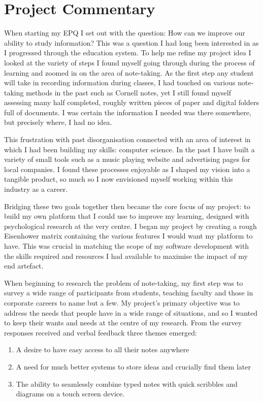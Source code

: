 \chapter{Project Commentary}
When starting my EPQ I set out with the question: How can we improve our ability to study information? This was a question I had long been interested in as I progressed through the education system. To help me refine my project idea I looked at the variety of steps I found myself going through during the process of learning and zoomed in on the area of note-taking. As the first step any student will take in recording information during classes, I had touched on various note-taking methods in the past such as Cornell notes, yet I still found myself assessing many half completed, roughly written pieces of paper and digital folders full of documents. I was certain the information I needed was there somewhere, but precisely where, I had no idea.

This frustration with past disorganisation connected with an area of interest in which I had been building my skills: computer science. In the past I have built a variety of small tools such as a music playing website and advertising pages for local companies. I found these processes enjoyable as I shaped my vision into a tangible product, so much so I now envisioned myself working within this industry as a career. 

Bridging these two goals together then became the core focus of my project: to build my own platform that I could use to improve my learning, designed with psychological research at the very centre. I began my project by creating a rough Eisenhower matrix containing the various features I would want my platform to have. This was crucial in matching the scope of my software development with the skills required and resources I had available to maximise the impact of my end artefact.

When beginning to research the problem of note-taking, my first step was to survey a wide range of participants from students, teaching faculty and those in corporate careers to name but a few. My project's primary objective was to address the needs that people have in a wide range of situations, and so I wanted to keep their wants and needs at the centre of my research. From the survey responses received and verbal feedback three themes emerged:

\begin{enumerate}
    \item A desire to have easy access to all their notes anywhere
    \item A need for much better systems to store ideas and crucially find them later
    \item The ability to seamlessly combine typed notes with quick scribbles and diagrams  on a touch screen device. 
\end{enumerate}

